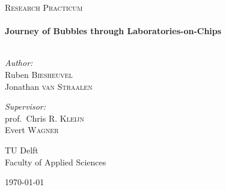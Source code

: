 \begin{titlepage}
\begin{center}



\textsc{\Large Research Practicum}\\[0.5cm]

\HRule \\[0.4cm]
{ \huge \bfseries Journey of Bubbles through Laboratories-on-Chips}\\[0.4cm]

\HRule \\[1.5cm]

\begin{minipage}{0.45\textwidth}
\begin{flushleft} \large
\emph{Author:}\\
Ruben \textsc{Biesheuvel}\\
Jonathan \textsc{van Straalen}
\end{flushleft}
\end{minipage}
\begin{minipage}{0.45\textwidth}
\begin{flushright} \large
\emph{Supervisor:} \\
prof.~Chris R. \textsc{Kleijn}\\
Evert \textsc{Wagner}

\end{flushright}
\end{minipage}

\vfill

\begin{minipage}{0.45\textwidth}
\begin{flushleft}
{\large TU Delft}\\
{\normalsize Faculty of Applied Sciences}
\end{flushleft}
\end{minipage}
\begin{minipage}{0.45\textwidth}
\begin{flushright}
{\large \today}
\end{flushright}
\end{minipage}




\end{center}
\end{titlepage}